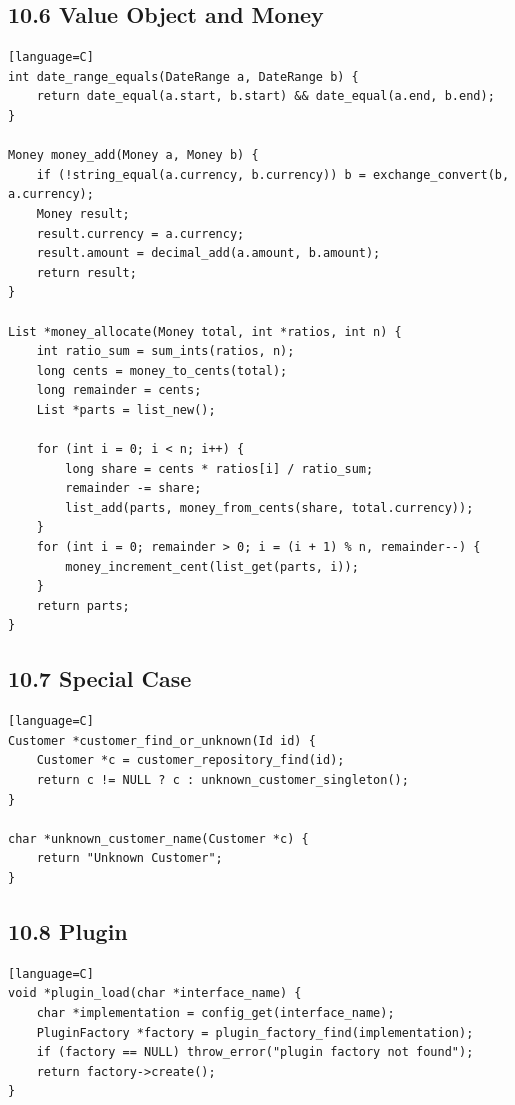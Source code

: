 \documentclass[11pt]{article}
\begin{document}
\subsection{10.6 Value Object and Money}\label{value-object-and-money}

\begin{verbatim}[language=C]
int date_range_equals(DateRange a, DateRange b) {
    return date_equal(a.start, b.start) && date_equal(a.end, b.end);
}

Money money_add(Money a, Money b) {
    if (!string_equal(a.currency, b.currency)) b = exchange_convert(b, a.currency);
    Money result;
    result.currency = a.currency;
    result.amount = decimal_add(a.amount, b.amount);
    return result;
}

List *money_allocate(Money total, int *ratios, int n) {
    int ratio_sum = sum_ints(ratios, n);
    long cents = money_to_cents(total);
    long remainder = cents;
    List *parts = list_new();

    for (int i = 0; i < n; i++) {
        long share = cents * ratios[i] / ratio_sum;
        remainder -= share;
        list_add(parts, money_from_cents(share, total.currency));
    }
    for (int i = 0; remainder > 0; i = (i + 1) % n, remainder--) {
        money_increment_cent(list_get(parts, i));
    }
    return parts;
}
\end{verbatim}

\subsection{10.7 Special Case}\label{special-case}

\begin{verbatim}[language=C]
Customer *customer_find_or_unknown(Id id) {
    Customer *c = customer_repository_find(id);
    return c != NULL ? c : unknown_customer_singleton();
}

char *unknown_customer_name(Customer *c) {
    return "Unknown Customer";
}
\end{verbatim}

\subsection{10.8 Plugin}\label{plugin}

\begin{verbatim}[language=C]
void *plugin_load(char *interface_name) {
    char *implementation = config_get(interface_name);
    PluginFactory *factory = plugin_factory_find(implementation);
    if (factory == NULL) throw_error("plugin factory not found");
    return factory->create();
}
\end{verbatim}
\end{document}
